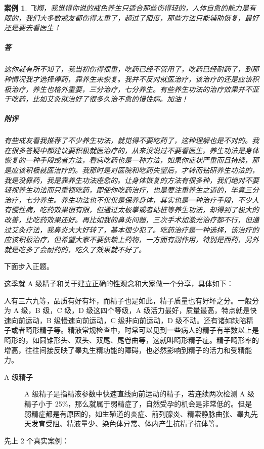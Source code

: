 \documentclass[fontset=founder]{ctexart}
\newtheorem{case}{案例}
\begin{document}
\begin{case}
    飞翔，我觉得你说的戒色养生只适合那些伤得轻的，人体自愈的能力是有限的，我们大多数戒友都伤得太重了，超过了限度，那些方法只能辅助恢复，最好还是要去看医生！
    \subparagraph{答} 这你就有所不知了，我当初伤得很重，吃药已经不管用了，吃药已经耐药了，到那种情况我才选择停药，靠养生来恢复。我并不反对就医治疗，该治疗的还是应该积极治疗，养生也格外重要，三分治疗，七分养生。有些养生功法的治疗效果并不亚于吃药，比如艾灸就治好了很多久治不愈的慢性病。加油！
    \subparagraph{附评} 有些戒友看我推荐了不少养生功法，就觉得不要吃药了，这种理解也是不对的。我在很多答疑中都建议要积极就医治疗的，从来没说过不要看医生。养生功法是身体恢复的一种手段或者方法，看病吃药也是一种方法，如果你症状严重而且持续，那是应该积极就医治疗的。我那时是对医院和吃药失望后，才转而钻研养生功法的，我是没靠药，我是靠养生功法痊愈的。让身体恢复的方法有很多种，我们绝对不要轻视养生功法而只重视吃药，即使你吃药治疗，也是要注重养生之道的，毕竟三分治疗，七分养生。养生功法也不仅仅是保养身体，其实也是一种治疗手段，不少人有慢性病，吃药效果很有限，但通过太极拳或者站桩等养生功法，却得到了极大的改善，比吃药效果还好。再比如我的鼻炎问题，三次手术加激光治疗都不行，但通过艾灸疗法，我鼻炎大大好转了，基本很少犯了。吃药治疗是一种选择，该治疗的应该积极治疗，但希望大家不要依赖上药物，一方面有副作用，特别是西药，另外就是吃多了会耐药的，吃久了效果就不好了。
\end{case}

下面步入正题。

这季就 A 级精子和关于建立正确的性观念和大家做一个分享，具体如下：

人有三六九等，品质有好有坏，而精子也是如此，精子质量也有好坏之分。一般分为 A 级，B 级，C 级，D 级这四个等级，A 级活力最好，质量最高，特点就是快速向前运动，B 级慢速向前运动，C 级非向前运动，D 级不动。还有诸如缺陷精子或者畸形精子等。精液常规检查中，时常可以见到一些病人的精子有半数以上是畸形的，如圆锥形头、双头、双尾、尾卷曲等，这就叫畸形精子症。精子畸形率的增高，往往间接反映了睾丸生精功能的障碍，也必然影响到精子的活力和受精能力。

\begin{description}
    \item[A 级精子] A 级精子是指精液参数中快速直线向前运动的精子，若连续两次检测 A 级精子小于 25\%，那么就属于弱精症了，自然受孕的机会是非常低的。但是弱精症都是有原因的，如生殖道的炎症、前列腺炎、精索静脉曲张、睾丸先天发育受阻、精液量少、染色体异常、体内产生抗精子抗体等。
\end{description}

先上 2 个真实案例：
\end{document}

